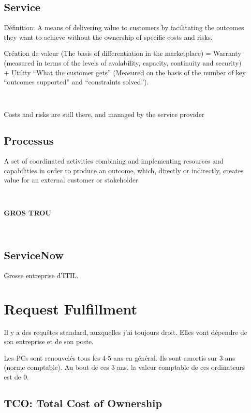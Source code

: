 \documentclass[a4paper,11pt]{article}
\begin{document}
\subsection{Service}

Définition: A means of delivering value to customers by facilitating the
outcomes they want to achieve without the ownership of specific costs and risks.

Création de valeur (The basis of differentiation in the marketplace) =
Warranty (measured in terms of the levels of avalability, capacity, continuity
and security) + Utility ``What the customer gets'' (Measured on the basis of the
number of key ``outcomes supported'' and ``constraints solved'').

\

Costs and risks are still there, and managed by the service provider

\subsection{Processus}

A set of coordinated activities combining and implementing resources and
capabilities in order to produce an outcome, which, directly or indirectly,
creates value for an external customer or stakeholder.

\

\textbf{GROS TROU}

\

\subsection{ServiceNow}

Grosse entreprise d'ITIL.

\section{Request Fulfillment}

Il y a des requêtes standard, auxquelles j'ai toujours droit. Elles vont
dépendre de son entreprise et de son poste.

Les PCs sont renouvelés tous les 4-5 ans en général. Ils sont amortis sur 3 ans
(norme comptable). Au bout de ces 3 ans, la valeur comptable de ces ordinateurs
est de 0.

\subsection{TCO: Total Cost of Ownership}
\end{document}
